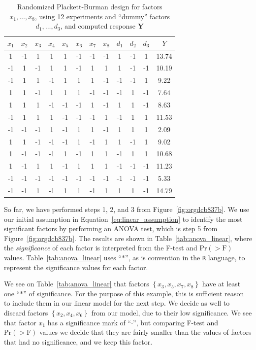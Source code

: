 \documentclass[conference]{IEEEtran}
\begin{document}
\begin{table}[b]
\centering
\caption{Randomized Plackett-Burman design for factors $x_1, \dots, x_8$, using 12 experiments and ``dummy'' factors $d_1, \dots, d_3$, and computed response $\mathbf{Y}$}
\label{tab:plackett}
\begingroup\scriptsize
\begin{tabular}{cccccccccccc}
  \toprule
$x_1$ & $x_2$ & $x_3$ & $x_4$ & $x_5$ & $x_6$ & $x_7$ & $x_8$ & $d_1$ & $d_2$ & $d_3$ & $Y$ \\
  \midrule
1 & -1 & 1 & 1 & 1 & -1 & -1 & -1 & 1 & -1 & 1 & 13.74 \\
  -1 & 1 & -1 & 1 & 1 & -1 & 1 & 1 & 1 & -1 & -1 & 10.19 \\
  -1 & 1 & 1 & -1 & 1 & 1 & 1 & -1 & -1 & -1 & 1 & 9.22 \\
  1 & 1 & -1 & 1 & 1 & 1 & -1 & -1 & -1 & 1 & -1 & 7.64 \\
  1 & 1 & 1 & -1 & -1 & -1 & 1 & -1 & 1 & 1 & -1 & 8.63 \\
  -1 & 1 & 1 & 1 & -1 & -1 & -1 & 1 & -1 & 1 & 1 & 11.53 \\
  -1 & -1 & -1 & 1 & -1 & 1 & 1 & -1 & 1 & 1 & 1 & 2.09 \\
  1 & 1 & -1 & -1 & -1 & 1 & -1 & 1 & 1 & -1 & 1 & 9.02 \\
  1 & -1 & -1 & -1 & 1 & -1 & 1 & 1 & -1 & 1 & 1 & 10.68 \\
  1 & -1 & 1 & 1 & -1 & 1 & 1 & 1 & -1 & -1 & -1 & 11.23 \\
  -1 & -1 & -1 & -1 & -1 & -1 & -1 & -1 & -1 & -1 & -1 & 5.33 \\
  -1 & -1 & 1 & -1 & 1 & 1 & -1 & 1 & 1 & 1 & -1 & 14.79 \\
   \bottomrule
\end{tabular}
\endgroup
\end{table}

So far, we have performed steps 1, 2, and 3 from
Figure~\ref{fig:orgdcb837b}. We use our initial assumption in
Equation~\eqref{eq:linear_assumption} to identify the most significant
factors by performing an ANOVA test, which is step 5 from
Figure~\ref{fig:orgdcb837b}. The results are shown in
Table~\ref{tab:anova_linear}, where the \emph{significance} of each factor is
interpreted from the F-test and \(\text{Pr}(>\text{F})\) values.
Table~\ref{tab:anova_linear} uses ``\(*\)'', as is convention in the
\texttt{R} language, to represent the significance values for each factor.

We see on Table~\ref{tab:anova_linear} that factors
\(\left\{x_3,x_5,x_7,x_8\right\}\) have at least one ``\(*\)'' of significance. For
the purpose of this example, this is sufficient reason to include them in our
linear model for the next step. We decide as well to discard factors
\(\left\{x_2,x_4,x_6\right\}\) from our model, due to their low significance. We
see that factor \(x_1\) has a significance mark of ``\(\cdot\)'', but comparing F-test
and \(\text{Pr}(>\text{F})\) values we decide that they are fairly
smaller than the values of factors that had no significance, and we keep this
factor.
\end{document}
